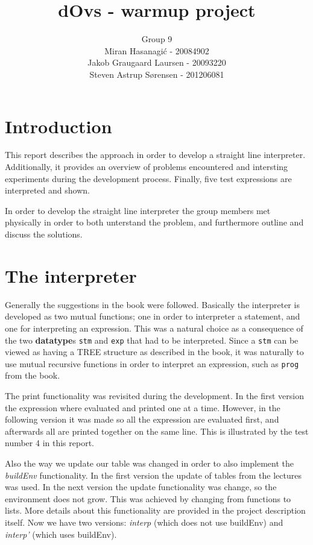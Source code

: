 \documentclass[a4paper]{article}
\title{dOvs - warmup project}
\author{
  Group 9 \\
  Miran Hasanagi\'{c} - 20084902 \\
  Jakob Graugaard Laursen - 20093220\\
  Steven Astrup S\o rensen - 201206081
}
\begin{document}
\maketitle

\section{Introduction}

This report describes the approach in order to develop a straight line interpreter. Additionally, it provides an overview of problems encountered and intersting experiments during the development process. Finally, five test expressions are interpreted and shown.

In order to develop the straight line interpreter the group members met physically in order to both unterstand the problem, and furthermore outline and discuss the solutions.

\section{The interpreter}

Generally the suggestions in the book were followed. Basically the interpreter is developed as two mutual functions; one in order to interpreter a statement, and one for interpreting an expression. This was a natural choice as a consequence of the two \textbf{datatype}s \texttt{stm} and \texttt{exp} that had to be interpreted. Since a \texttt{stm} can be viewed as having a TREE structure as described in the book, it was naturally to use mutual recursive functions in order to interpret an expression, such as \texttt{prog} from the book.

The print functionality was revisited during the development. In the first version the expression where evaluated and printed one at a time. However, in the following version it was made so all the expression are evaluated first, and afterwards all are printed together on the same line. This is illustrated by the test number 4 in this report.

Also the way we update our table was changed in order to also implement the \textit{buildEnv} functionality. In the first version the update of tables from the lectures was used. In the next version the update functionality was change, so the environment does not grow. This was achieved by changing from functions to lists. More details about this functionality are provided in the project description itself. Now we have two versions: \textit{interp} (which does not use buildEnv) and \textit{interp'} (which uses buildEnv).
\end{document}
